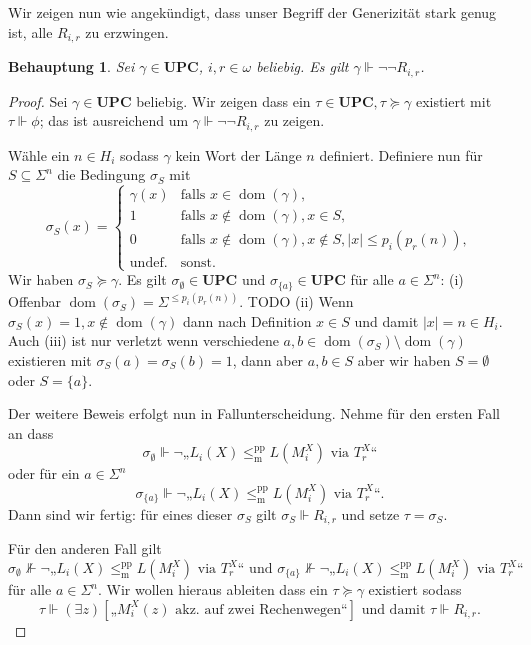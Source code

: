 \documentclass[nofonts]{uebung}
\newtheorem{claim}[theorem]{Behauptung}
\theoremstyle{definition}
\DeclareMathOperator{\dom}{dom}
\def\leqmpp{\ensuremath{\leq_\mathrm{m}^\mathrm{pp}}}
\begin{document}
Wir zeigen nun wie angekündigt, dass unser Begriff der Generizität stark genug ist, alle $R_{i,r}$ zu erzwingen.
\begin{claim}
    Sei $\gamma\in\mathbf{UPC}$, $i,r\in\omega$ beliebig. Es gilt $\gamma\Vdash\neg\neg   R_{i,r}$.
\end{claim}
\begin{proof}
    Sei $\gamma\in\mathbf{UPC}$ beliebig. Wir zeigen dass ein $\tau\in\mathbf{UPC}, \tau\succeq \gamma$ existiert mit $\tau\Vdash\phi$;
    das ist ausreichend um $\gamma\Vdash\neg\neg   R_{i,r}$ zu zeigen.

    Wähle ein $n\in H_i$ sodass $\gamma$ kein Wort der Länge $n$ definiert.
    Definiere nun für $S\subseteq\Sigma^n$ die Bedingung $\sigma_S$ mit
    \[ \sigma_S(x)  =\begin{cases}
    \gamma(x) & \text{falls $x\in\dom(\gamma)$},\\
    1 & \text{falls $x\not\in\dom(\gamma), x\in S$},\\
    0 & \text{falls $x\not\in\dom(\gamma), x\not\in S, |x|\leq p_i(p_r(n))$},\\
    \text{undef.} & \text{sonst}.
    \end{cases}
    \]
    Wir haben $\sigma_S\succeq \gamma$.
    Es gilt $\sigma_\emptyset\in\mathbf{UPC}$ und $\sigma_{\{a\}}\in\mathbf{UPC}$ für alle $a\in \Sigma^n$:
    (i) Offenbar $\dom(\sigma_S)=\Sigma^{\leq p_i(p_r(n))}$.
    TODO
    (ii) Wenn $\sigma_S(x)=1,x\not\in\dom(\gamma)$ dann nach Definition $x\in S$ und damit $|x|=n\in H_i$.
    Auch (iii) ist nur verletzt wenn verschiedene $a,b\in\dom(\sigma_S)\setminus\dom(\gamma)$ existieren mit $\sigma_S(a)=\sigma_S(b)=1$, dann aber $a,b\in S$ aber wir haben $S=\emptyset$ oder $S=\{a\}$.

    Der weitere Beweis erfolgt nun in Fallunterscheidung. Nehme für den ersten Fall an dass
    \[ \sigma_\emptyset \Vdash \neg„L_{i}(X)\leqmpp L(M_i^X)\text{ via }T^X_r“ \]
    oder für ein $a\in\Sigma^n$
    \[ \sigma_{\{a\}} \Vdash \neg„L_{i}(X)\leqmpp L(M_i^X)\text{ via }T^X_r“. \]
    Dann sind wir fertig: für eines dieser $\sigma_S$ gilt $\sigma_S\Vdash   R_{i,r}$ und setze $\tau=\sigma_S$.

    Für den anderen Fall gilt 
    \[ \sigma_\emptyset \not\Vdash \neg„L_{i}(X)\leqmpp L(M_i^X)\text{ via }T^X_r“ \text{ und }\sigma_{\{a\}} \not\Vdash \neg„L_{i}(X)\leqmpp L(M_i^X)\text{ via }T^X_r“ \]
    für alle $a\in\Sigma^n$.
    Wir wollen hieraus ableiten dass ein $\tau\succeq\gamma$ existiert sodass
    \[ \tau\Vdash (\exists z)[\text{„$M_i^X(z)$ akz. auf zwei Rechenwegen“}] \text{ und damit } \tau\Vdash  R_{i,r}. \]


\end{proof}
\end{document}

